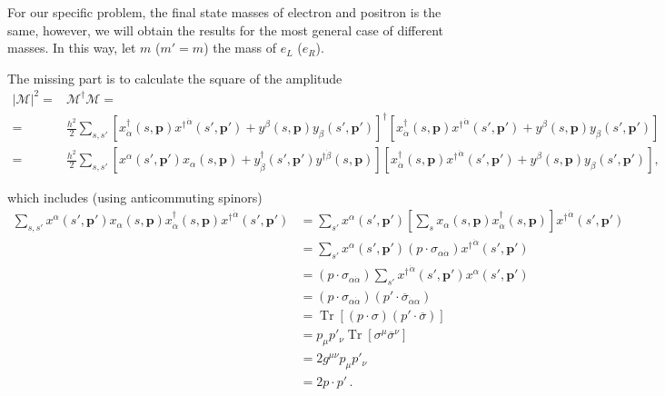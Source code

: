 \begin{frame}
For our specific problem, the final state masses of electron and positron is the same, however, we will obtain the results for the most general case of different masses. In this way, let $m$ ($m'=m$) the mass of $e_L$ ($e_R$).

The missing part is to calculate the square of the amplitude
\begin{align}
  \left| \mathcal{M} \right|^2=&\mathcal{M}^{\dagger}\mathcal{M}= \nonumber\\
=&\frac{h^{2}}{2}\sum_{s,s'}
 \left[ x^{\dagger}_{\dot{\alpha}}(s,\boldsymbol{p}){x^{\dagger}}^{\dot{\alpha}}(s',\boldsymbol{p}')+y^{\beta}(s,\boldsymbol{p})y_{\beta}(s',\boldsymbol{p}') \right]^{\dagger}
\left[ x^{\dagger}_{\dot{\alpha}}(s,\boldsymbol{p}){x^{\dagger}}^{\dot{\alpha}}(s',\boldsymbol{p}')+y^{\beta}(s,\boldsymbol{p})y_{\beta}(s',\boldsymbol{p}') \right] \nonumber\\
  =&\frac{h^2}{2}\sum_{s,s'} \left[x^{\alpha}(s',\boldsymbol{p}') x_{\alpha}(s,\boldsymbol{p})+y^{\dagger}_{\dot{\beta}}(s',\boldsymbol{p}')y^{\dagger\dot{\beta}}(s,\boldsymbol{p}) \right]
\left[ x^{\dagger}_{\dot{\alpha}}(s,\boldsymbol{p}){x^{\dagger}}^{\dot{\alpha}}(s',\boldsymbol{p}')+y^{\beta}(s,\boldsymbol{p})y_{\beta}(s',\boldsymbol{p}') \right],
\end{align}

 which includes (using anticommuting spinors)
\begin{align}
\sum_{s,s'}x^{\alpha}(s',\boldsymbol{p}') x_{\alpha}(s,\boldsymbol{p})
x^{\dagger}_{\dot{\alpha}}(s,\boldsymbol{p}){x^{\dagger}}^{\dot{\alpha}}(s',\boldsymbol{p}') 
&= \sum_{s'}x^{\alpha}(s',\boldsymbol{p}')  \left[ 
\sum_{s} x_{\alpha}(s,\boldsymbol{p})x^{\dagger}_{\dot{\alpha}}(s,\boldsymbol{p})\right]
{x^{\dagger}}^{\dot{\alpha}}(s',\boldsymbol{p}')  \nonumber\\
&= \sum_{s'}x^{\alpha}(s',\boldsymbol{p}') \left( p\cdot \sigma_{\alpha{\dot{\alpha}}}  \right)
{x^{\dagger}}^{\dot{\alpha}}(s',\boldsymbol{p}')  \nonumber\\
&=\left( p\cdot \sigma_{\alpha{\dot{\alpha}}}  \right) \sum_{s'} {x^{\dagger}}^{\dot{\alpha}}(s',\boldsymbol{p}') x^{\alpha}(s',\boldsymbol{p}')  \nonumber\\
&=\left( p\cdot \sigma_{\alpha{\dot{\alpha}}}  \right) \left( p'\cdot \overline{\sigma}_{\dot{\alpha}\alpha} \right) \nonumber\\
&=\operatorname{Tr}\left[ \left( p\cdot \sigma \right)\left( p'\cdot \overline{\sigma} \right)  \right] \nonumber\\
&=p_{\mu}p'_{\nu}\operatorname{Tr}\left[ \sigma^{\mu} \overline{\sigma}^{\nu}  \right] \nonumber\\ 
&=2 g^{\mu\nu}p_{\mu}p'_{\nu} \nonumber\\
&=2 p\cdot p'\,.
\end{align}


\end{frame}

